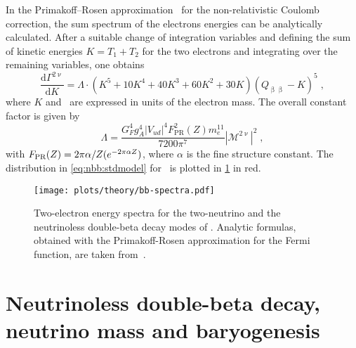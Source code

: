 In the Primakoff–Rosen approximation~\cite{Primakoff1959} for the non-relativistic Coulomb
correction, the sum spectrum of the electrons energies can be analytically calculated.
After a suitable change of integration variables and defining the sum of kinetic energies
$K=T_1+T_2$ for the two electrons and integrating over the remaining variables, one obtains
\begin{equation}\label{eq:nbb:stdmodel}
  \frac{\text{d}\Gamma^{2\upnu}}{\text{d}K} =
  \Lambda \cdot (K^5+10K^4+40K^3+60K^2+30K) {(Q_{\upbeta\upbeta}-K)}^5 \;,
\end{equation}
where $K$ and \qbb\ are expressed in units of the electron mass. The overall constant
factor is given by
\[
  \Lambda = \frac{G_F^4g_A^4|V_{ud}|^4F^2_\text{PR}(Z)m_e^{11}}{7200\pi^7}
            |\mathcal{M}^{2\upnu}|^2 \;,
\]
with $F_\text{PR}(Z) = 2\pi\alpha/Z(\-e^{-2\pi\alpha Z})$, where $\alpha$ is the fine
structure constant. The distribution in \cref{eq:nbb:stdmodel} for \gesix\ is plotted in
\cref{fig:nbb:spectra} in red.

\begin{figure}
  \centering
  \texttt{[image: plots/theory/bb-spectra.pdf]}
  \caption{%
    Two-electron energy spectra for the two-neutrino and the neutrinoless
    double-beta decay modes of \gesix. Analytic formulas, obtained with the
    Primakoff-Rosen approximation for the Fermi function, are taken
    from~\cite{Tretyak1995, Tretyak2002}.
  }\label{fig:nbb:spectra}
\end{figure}

\section{Neutrinoless double-beta decay, neutrino mass and baryogenesis}%
\label{sec:nbb:0nbb}

